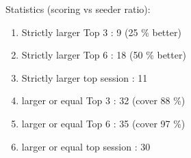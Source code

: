 Statistics (scoring vs seeder ratio): 
\begin{enumerate}
	\item Strictly larger Top 3  : 9 (25 \% better)
	\item Strictly larger Top 6  : 18 (50 \% better)
	\item Strictly larger top session  : 11
	\item larger or equal Top 3  : 32 (cover 88 \%)
	\item larger or equal Top 6  : 35 (cover 97 \%)
	\item larger or equal top session  : 30
\end{enumerate}